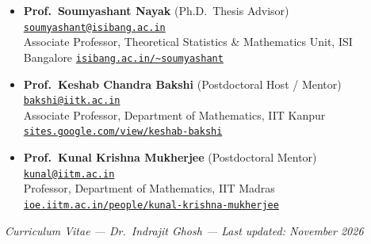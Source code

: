 \documentclass[10pt,a4paper,sans]{moderncv}
\begin{document}
\begin{itemize}[leftmargin=0pt, label={}, itemsep=0.55em]
  \item \textbf{\textcolor{color1}{Prof.~Soumyashant Nayak}} \textnormal{\small\textcolor{color2}{(Ph.D.~Thesis Advisor)}} \hfill \textcolor{accentblue}{}\enskip\href{mailto:soumyashant@isibang.ac.in}{\texttt{soumyashant@isibang.ac.in}} \\
    Associate Professor, Theoretical Statistics \& Mathematics Unit, ISI Bangalore \hfill \textcolor{accentblue}{}\enskip\href{https://www.isibang.ac.in/~soumyashant/}{\texttt{isibang.ac.in/\textasciitilde soumyashant}}

  \item \textbf{\textcolor{color1}{Prof.~Keshab Chandra Bakshi}} \textnormal{\small\textcolor{color2}{(Postdoctoral Host / Mentor)}} \hfill \textcolor{accentblue}{}\enskip\href{mailto:bakshi@iitk.ac.in}{\texttt{bakshi@iitk.ac.in}} \\
    Associate Professor, Department of Mathematics, IIT Kanpur \hfill \textcolor{accentblue}{}\enskip\href{https://sites.google.com/view/keshab-bakshi/home}{\texttt{sites.google.com/view/keshab-bakshi}}

  \item \textbf{\textcolor{color1}{Prof.~Kunal Krishna Mukherjee}} \textnormal{\small\textcolor{color2}{(Postdoctoral Mentor)}} \hfill \textcolor{accentblue}{}\enskip\href{mailto:kunal@iitm.ac.in}{\texttt{kunal@iitm.ac.in}} \\
    Professor, Department of Mathematics, IIT Madras \hfill \textcolor{accentblue}{}\enskip\href{https://ioe.iitm.ac.in/people/kunal-krishna-mukherjee/}{\texttt{ioe.iitm.ac.in/people/kunal-krishna-mukherjee}}
\end{itemize}

\vfill
\begin{center}
  \small\textcolor{color2}{\emph{Curriculum Vitae --- Dr.~Indrajit Ghosh --- Last updated: November 2026}}
\end{center}
\end{document}

